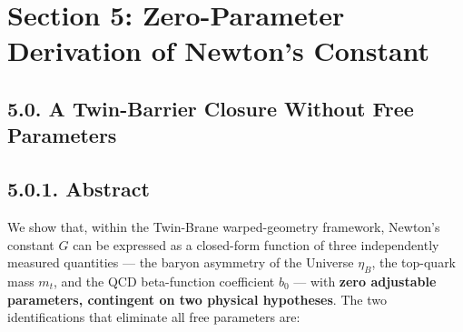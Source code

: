 \documentclass[
  11pt,
]{article}
\begin{document}
\bigskip

\hypertarget{section-5-zero-parameter-derivation-of-newtons-constant}{%
\section{Section 5: Zero-Parameter Derivation of Newton's
Constant}\label{section-5-zero-parameter-derivation-of-newtons-constant}}

\hypertarget{a-twin-barrier-closure-without-free-parameters}{%
\subsection{5.0. A Twin-Barrier Closure Without Free
Parameters}\label{a-twin-barrier-closure-without-free-parameters}}

\bigskip

\hypertarget{abstract}{%
\subsection{5.0.1. Abstract}\label{abstract}}

We show that, within the Twin-Brane warped-geometry framework, Newton's
constant \(G\) can be expressed as a closed-form function of three
independently measured quantities --- the baryon asymmetry of the
Universe \(\eta_B\), the top-quark mass \(m_t\), and the QCD
beta-function coefficient \(b_0\) --- with \textbf{zero adjustable
parameters, contingent on two physical hypotheses}. The two
identifications that eliminate all free parameters are:
\end{document}
